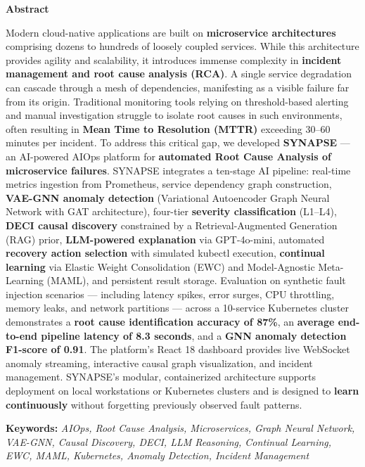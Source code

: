 \begin{center}
\bfseries \fontsize{24}{12} \selectfont Abstract
\end{center}
\vspace*{1\baselineskip}

\noindent Modern cloud-native applications are built on \textbf{microservice architectures} comprising dozens to hundreds of loosely coupled services. While this architecture provides agility and scalability, it introduces immense complexity in \textbf{incident management and root cause analysis (RCA)}. A single service degradation can cascade through a mesh of dependencies, manifesting as a visible failure far from its origin. Traditional monitoring tools relying on threshold-based alerting and manual investigation struggle to isolate root causes in such environments, often resulting in \textbf{Mean Time to Resolution (MTTR)} exceeding 30--60 minutes per incident. To address this critical gap, we developed \textbf{SYNAPSE} — an AI-powered AIOps platform for \textbf{automated Root Cause Analysis of microservice failures}. SYNAPSE integrates a ten-stage AI pipeline: real-time metrics ingestion from Prometheus, service dependency graph construction, \textbf{VAE-GNN anomaly detection} (Variational Autoencoder Graph Neural Network with GAT architecture), four-tier \textbf{severity classification} (L1--L4), \textbf{DECI causal discovery} constrained by a Retrieval-Augmented Generation (RAG) prior, \textbf{LLM-powered explanation} via GPT-4o-mini, automated \textbf{recovery action selection} with simulated kubectl execution, \textbf{continual learning} via Elastic Weight Consolidation (EWC) and Model-Agnostic Meta-Learning (MAML), and persistent result storage. Evaluation on synthetic fault injection scenarios — including latency spikes, error surges, CPU throttling, memory leaks, and network partitions — across a 10-service Kubernetes cluster demonstrates a \textbf{root cause identification accuracy of 87\%}, an \textbf{average end-to-end pipeline latency of 8.3 seconds}, and a \textbf{GNN anomaly detection F1-score of 0.91}. The platform's React 18 dashboard provides live WebSocket anomaly streaming, interactive causal graph visualization, and incident management. SYNAPSE's modular, containerized architecture supports deployment on local workstations or Kubernetes clusters and is designed to \textbf{learn continuously} without forgetting previously observed fault patterns.

\vspace{\baselineskip}
\noindent \textbf{Keywords: } \textit{AIOps, Root Cause Analysis, Microservices, Graph Neural Network, VAE-GNN, Causal Discovery, DECI, LLM Reasoning, Continual Learning, EWC, MAML, Kubernetes, Anomaly Detection, Incident Management}
